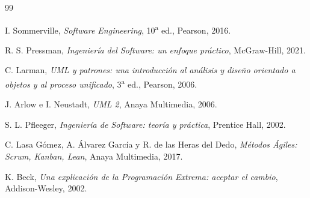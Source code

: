 \documentclass[a4paper,12pt]{book}
\begin{document}





\newpage
\begin{thebibliography}{99}

I. Sommerville, \emph{Software Engineering}, 10\textsuperscript{a} ed., Pearson,
2016.

R. S. Pressman, \emph{Ingeniería del Software: un enfoque práctico}, McGraw-Hill,
2021.

C. Larman, \emph{UML y patrones: una introducción al análisis y diseño orientado
a objetos y al proceso unificado}, 3\textsuperscript{a} ed., Pearson, 2006.

J. Arlow e I. Neustadt, \emph{UML 2}, Anaya Multimedia, 2006.

S. L. Pfleeger, \emph{Ingeniería de Software: teoría y práctica}, Prentice Hall,
2002.

C. Lasa Gómez, A. Álvarez García y R. de las Heras del Dedo, \emph{Métodos
Ágiles: Scrum, Kanban, Lean}, Anaya Multimedia, 2017.

K. Beck, \emph{Una explicación de la Programación Extrema: aceptar el cambio},
Addison-Wesley, 2002.

\end{thebibliography}
\end{document}
